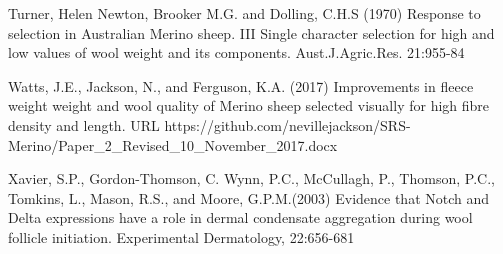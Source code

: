 \documentclass[titlepage]{article}  %
\begin{document}
\begin{thebibliography}{99}
Turner, Helen Newton, Brooker M.G. and Dolling, C.H.S (1970) Response to selection in Australian Merino sheep. III Single character selection for high and low values of wool weight and its components. Aust.J.Agric.Res. 21:955-84

Watts, J.E., Jackson, N., and Ferguson, K.A. (2017) Improvements in fleece weight weight and wool quality of Merino sheep selected visually for high fibre density and length. URL https://github.com/nevillejackson/SRS-Merino/Paper\_2\_Revised\_10\_November\_2017.docx 

Xavier, S.P., Gordon-Thomson, C. Wynn, P.C., McCullagh, P., Thomson, P.C., Tomkins, L., Mason, R.S., and Moore, G.P.M.(2003) Evidence that Notch and Delta expressions have a role in dermal condensate aggregation during wool follicle initiation. Experimental Dermatology, 22:656-681

\end{thebibliography}
\end{document}
